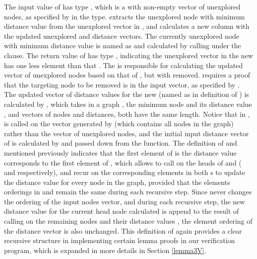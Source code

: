 The input value  of  has type , which is a  with non-empty vector of unexplored nodes, as specified by  in the type.  extracts the unexplored node with minimum distance value from the unexplored vector in , and calculates a new column with the updated unexplored and distance vectors. The currently unexplored node with minimum distance value is named as  and calculated by calling  under the  clause. The return value of  has type , indicating the unexplored vector in the new  has one less element than that . The  is responsible for calculating the updated vector of unexplored nodes based on that of , but with  removed.  requires a proof that the targeting node to be removed is in the input vector, as specified by . 
\\

The updated vector of distance values for the new (named as  in definition of ) is calculated by , which takes in a graph , the minimum node  and its distance value , and vectors of nodes and distances, both have the same length. Notice that in ,  is called on the vector generated by  (which contains all nodes in the graph) rather than the vector of unexplored nodes, and the initial input distance vector of  is calculated by  and passed down from the  function. The definition of  and  mentioned previously indicates that the first element of  is the distance value corresponds to the first element of , which allows  to call  on the heads of  and  ( and  respectively), and recur on the corresponding elements in both s to update the distance value for every node in the graph, provided that the elements orderings in  and  remain the same during each recursive step. Since  never changes the ordering of the input nodes vector, and during each recursive step, the new distance value for the current head node  calculated is append to the result of calling  on the remaining nodes  and their distance values , the element ordering of the distance vector is also unchanged. This definition of  again provides a clear recursive structure in implementing certain lemma proofs in our verification program, which is expanded in more details in Section \ref{lemma3V}.
\\

